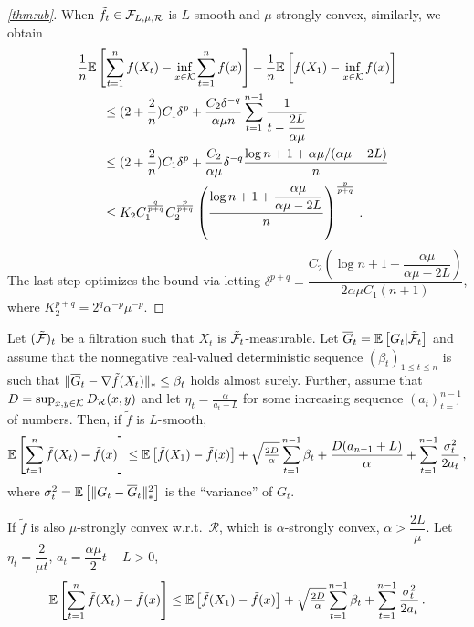 \begin{proof}[\cref{thm:ub}]
 When $\tilde{f}_t \in \mathcal{F}_{L,\mu, \mathcal{R}}$ is $L$-smooth and $\mu$-strongly convex, similarly, we obtain
 \begin{align*}
 \MoveEqLeft
\frac{1}{n} \EE{ \sum_{t=1}^n f( X_t) - \inf_{x \in \cK} \sum_{t=1}^n f(x)} -\frac{1}{n}\EE{f(X_1)-\inf_{x \in \cK}f(x)}\\
&\le (2+\dfrac{2}{n})C_1\delta^p+\dfrac{C_2 \delta^{-q}}{\alpha \mu n} \sum_{t=1}^{n-1}\dfrac{1}{t-\dfrac{2L}{\alpha \mu}}\\
&\le (2+\dfrac{2}{n})C_1\delta^p+\dfrac{C_2 }{\alpha \mu}\delta^{-q} \dfrac{\log n+1+\alpha \mu/(\alpha \mu-2L)}{n}\\
&\le K_2C_1^{\frac{q}{p+q}}C_2^{\frac{p}{p+q}} \left( \frac{\log n+1+\dfrac{\alpha \mu}{\alpha \mu -2L}}{n} \right)^{\frac{p}{p+q}}\,.
 \end{align*}
The last step optimizes the bound via letting
$\delta^{p+q} =  \dfrac{C_2\left( \log n+1+\dfrac{\alpha \mu}{\alpha \mu -2L}\right)}{2\alpha \mu C_1 (n+1)}$,
where
$K_2^{p+q}=2^{q}\alpha^{-p}\mu^{-p}$.
\end{proof}

\begin{lemma}
\label{lem:ub}
Let $({\tilde{\mathcal{F}}})_{t}$ be a filtration such that $X_t$ is ${\tilde{\mathcal{F}}}_t$-measurable.
Let $\overline G_t = \mathbb{E}\left[G_t|{\tilde{\mathcal{F}}}_t\right]$
and assume that the nonnegative real-valued deterministic sequence $(\beta_t)_{1\le t\le n}$ is such that
$\|\overline G_t - \nabla \tilde{f}(X_t)\|_* \le \beta_t$ holds almost surely.
Further, assume that $D=\sup_{x,y\in \mathcal{K}} D_{\mathcal{R}}(x,y)$ and let $\eta_t = \frac{\alpha}{a_t+L}$ for some increasing
sequence $(a_t)_{t=1}^{n-1}$ of numbers. Then, if $\tilde{f}$ is $L$-smooth,
\begin{align*}
\mathbb{E}\left[ \sum_{t=1}^n \tilde{f}(X_t) - \tilde{f}(x) \right]
\le 	 \mathbb{E}\left[\tilde{f}(X_1)-\tilde{f}(x)\right]+
  \sqrt{\tfrac{2D}{\alpha}} \sum_{t=1}^{n-1} \beta_t
 +\frac{D(a_{n-1}+L)}{\alpha} +
	  \sum_{t=1}^{n-1}\frac{\sigma_t^2}{2a_t}\,,
\end{align*}
where $\sigma_t^2 = \mathbb{E}\left[ \|G_t-\overline G_t\|_*^2\right]$ is the ``variance'' of $G_t$.

If ${\tilde{f}}$ is also $\mu$-strongly convex w.r.t.\  $\mathcal{R}$, which is $\alpha$-strongly convex, $\alpha > \dfrac{2L}{\mu}$. Let $\eta_t = \dfrac{2}{\mu t}$, $a_t = \dfrac{\alpha \mu}{2}t-L > 0$,
\begin{align*}
 \mathbb{E}\left[ \sum_{t=1}^n \tilde{f}(X_t) - \tilde{f}(x) \right]
\le 	 \mathbb{E}\left[\tilde{f}(X_1)-\tilde{f}(x)\right]+
 \sqrt{\tfrac{2D}{\alpha}} \sum_{t=1}^{n-1} \beta_t
 +\sum_{t=1}^{n-1}\frac{\sigma_t^2}{2a_t}\,.
\end{align*}
\end{lemma}


